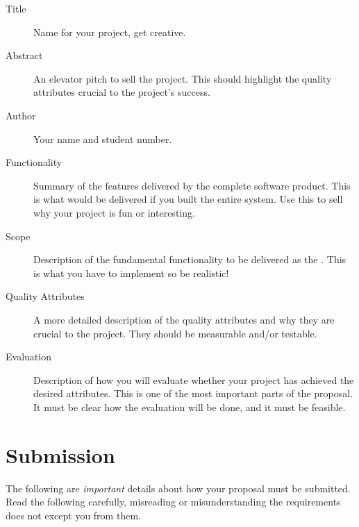 \documentclass{csse4400}
\begin{document}
\begin{description}
    \item[Title] Name for your project, get creative.
    \item[Abstract] An elevator pitch to sell the project.
                    This should highlight the quality attributes crucial to the project's success.
    \item[Author] Your name and student number.
    \item[Functionality] Summary of the features delivered by the complete software product.
                         This is what would be delivered if you built the entire system.
                         Use this to sell why your project is fun or interesting.
    \item[Scope] Description of the fundamental functionality to be delivered as the .
                 This is what you have to implement so be realistic!
    \item[Quality Attributes] A more detailed description of the quality attributes and why they are crucial to the project.
                              They should be measurable and/or testable.
    \item[Evaluation] Description of how you will evaluate whether your project has achieved the desired attributes.
                      This is one of the most important parts of the proposal.
                      It must be clear how the evaluation will be done, and it must be feasible.
\end{description}


\section{Submission}

The following are \emph{important} details about how your proposal must be submitted.
Read the following carefully, misreading or misunderstanding the requirements does not except you from them.
\end{document}
